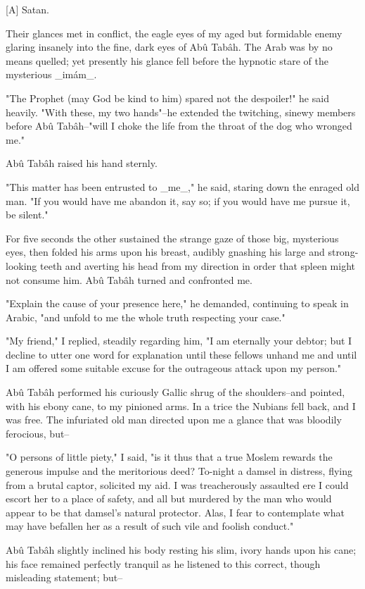   [A] Satan.

Their glances met in conflict, the eagle eyes of my aged but
formidable enemy glaring insanely into the fine, dark eyes of Abû
Tabâh. The Arab was by no means quelled; yet presently his glance fell
before the hypnotic stare of the mysterious _imám_.

"The Prophet (may God be kind to him) spared not the despoiler!" he
said heavily. "With these, my two hands"--he extended the twitching,
sinewy members before Abû Tabâh--"will I choke the life from the
throat of the dog who wronged me."

Abû Tabâh raised his hand sternly.

"This matter has been entrusted to _me_," he said, staring down the
enraged old man. "If you would have me abandon it, say so; if you
would have me pursue it, be silent."

For five seconds the other sustained the strange gaze of those big,
mysterious eyes, then folded his arms upon his breast, audibly
gnashing his large and strong-looking teeth and averting his head from
my direction in order that spleen might not consume him. Abû Tabâh
turned and confronted me.

"Explain the cause of your presence here," he demanded, continuing to
speak in Arabic, "and unfold to me the whole truth respecting your
case."

"My friend," I replied, steadily regarding him, "I am eternally your
debtor; but I decline to utter one word for explanation until these
fellows unhand me and until I am offered some suitable excuse for the
outrageous attack upon my person."

Abû Tabâh performed his curiously Gallic shrug of the shoulders--and
pointed, with his ebony cane, to my pinioned arms. In a trice the
Nubians fell back, and I was free. The infuriated old man directed
upon me a glance that was bloodily ferocious, but--

"O persons of little piety," I said, "is it thus that a true Moslem
rewards the generous impulse and the meritorious deed? To-night a
damsel in distress, flying from a brutal captor, solicited my aid.
I was treacherously assaulted ere I could escort her to a place of
safety, and all but murdered by the man who would appear to be that
damsel's natural protector. Alas, I fear to contemplate what may have
befallen her as a result of such vile and foolish conduct."

Abû Tabâh slightly inclined his body resting his slim, ivory hands
upon his cane; his face remained perfectly tranquil as he listened to
this correct, though misleading statement; but--

